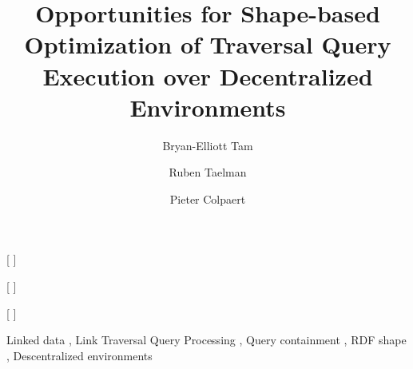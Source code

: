 \documentclass[
]{ceurart}
\begin{document}


\title{Opportunities for Shape-based Optimization of Traversal Query Execution over Decentralized Environments}


\author[1]{Bryan-Elliott Tam}[%
]

\author[1]{Ruben Taelman}[%
]
\author[1]{Pieter Colpaert}[%
]


\address[1]{IDLab,
Department of Electronics and Information Systems, Ghent University – imec}

\begin{keywords}
  Linked data \sep
  Link Traversal Query Processing \sep
  Query containment \sep
  RDF shape \sep
  Descentralized environments
\end{keywords}

\maketitle










\end{document}
